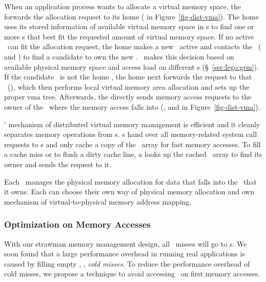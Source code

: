 When an application process wants to allocate a virtual memory space,
the \pcomponent{} forwards the allocation request 
to its home \mcomponent{} ( in Figure~\ref{fig-dist-vma}).
The home \mcomponent{} uses its stored information of available virtual memory space in \vregion{}s
to find one or more \vregion{}s that best fit the requested amount of virtual memory space.
If no active \vregion\ can fit the allocation request, the home \mcomponent{} makes a new \vregion\ active and 
contacts the \gmm\ ( and ) to find a candidate \mcomponent{} to own the new \vregion.
\gmm\ makes this decision based on available physical memory space and access load on different \mcomponent{}s (\S~\ref{sec:lego:grm}).
If the candidate \mcomponent\ is not the home \mcomponent{}, the home \mcomponent{} next forwards the request to that \mcomponent\ (),
which then performs local virtual memory area allocation and sets up the proper vma tree. 
Afterwards, the \pcomponent{} directly sends memory access requests to the owner of the \vregion\ where the memory access falls into
(\eg,  and  in Figure~\ref{fig-dist-vma}).


\lego' mechanism of distributed virtual memory management is efficient and it cleanly separates memory operations from \pcomponent{}s.
\pcomponent{}s hand over all memory-related system call requests to \mcomponent{}s
and only cache a copy of the \vregion\ array for fast memory accesses.
To fill a cache miss or to flush a dirty cache line, 
a \pcomponent{} looks up the cached \vregion\ array to find its owner \mcomponent{} and sends the request to it.

Each \mcomponent\ manages the physical memory allocation for data that falls into the
\vregion\ that it owns.
Each \mcomponent{} can choose their own way of physical memory allocation
and own mechanism of virtual-to-physical memory address mapping.


\subsubsection{Optimization on Memory Accesses}
\label{sec:lego:zerofill}
With our strawman memory management design, 
all \excache\ misses will go to \mcomponent{}s.
We soon found that a large performance overhead in running real applications 
is caused by filling empty \excache, \ie, {\em cold misses}.
To reduce the performance overhead of cold misses, we propose a technique 
to avoid accessing \mcomponent\ on first memory accesses.

